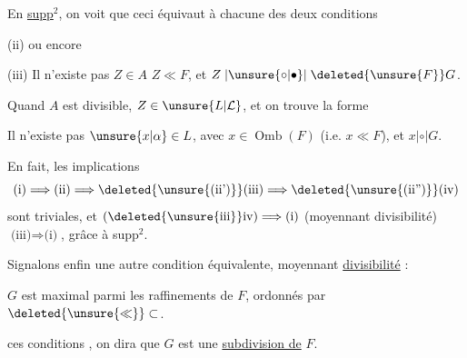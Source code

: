 En  \uline{ supp$^2$}, on voit que ceci équivaut à chacune des deux conditions

(ii)
ou encore

(iii) Il n'existe pas $Z\in A$  $Z\ll F$, et $Z\mathrel{|\unsure{\circ|\bullet}|}\deleted{\unsure{F}}G$.


Quand $A$ est divisible,  $Z\in\unsure{L|\mathcal{L}}$, et on trouve la forme

 Il n'existe pas $\unsure{x|\alpha}\in L$, avec $x\in\operatorname{Omb}(F)$ (i.e. $x\ll F$), et $x\mathrel{|\circ|}G$.

En fait, les implications
\[
\text{(i)}\Longrightarrow\text{(ii)}\Longrightarrow
\deleted{\text{\unsure{(ii')}}}\text{(iii)}\Longrightarrow
\deleted{\text{\unsure{(ii'')}}}\text{(iv)}
\]
sont  triviales, et $(\deleted{\unsure{\mathrm{iii}}}\mathrm{iv})\Longrightarrow\text{(i)}$ (moyennant divisibilité)  $\text{(iii)}\Longrightarrow\text{(i)}$, grâce à  supp$^2$.

Signalons enfin une autre condition équivalente, moyennant \uline{divisibilité} :

 $G$ est maximal parmi les raffinements de $F$, ordonnés par $\deleted{\unsure{\ll}}\subset$.

 ces conditions , on dira  que $G$ est une \uline{subdivision de} $F$. 



